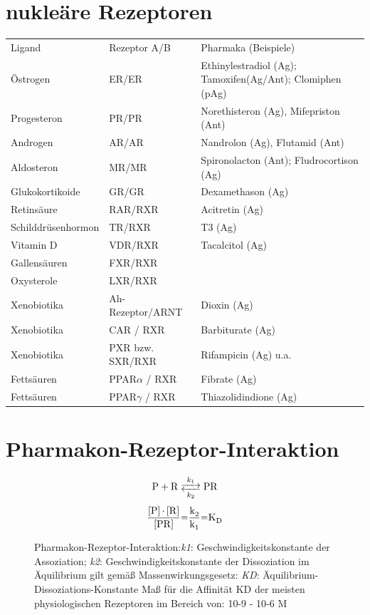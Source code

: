 \documentclass[10pt,a4paper]{report}
\newenvironment{reaction}{\begin{equation}}{\end{equation}}
\begin{document}
\section{nukleäre Rezeptoren}
\begin{tabularx}{\textwidth}{XXX}
Ligand&Rezeptor A/B&Pharmaka (Beispiele)\\
Östrogen&ER/ER&Ethinylestradiol (Ag); Tamoxifen(Ag/Ant); Clomiphen (pAg)\\
Progesteron&PR/PR&Norethisteron (Ag), Mifepriston (Ant)\\
Androgen&AR/AR&Nandrolon (Ag), Flutamid (Ant)\\
Aldosteron&MR/MR&Spironolacton (Ant); Fludrocortison (Ag)\\
Glukokortikoide&GR/GR&Dexamethason (Ag)\\
Retinsäure&RAR/RXR&Acitretin (Ag)\\		
Schilddrüsenhormon&TR/RXR&T3 (Ag)\\
Vitamin D&VDR/RXR&Tacalcitol (Ag)\\
Gallensäuren&FXR/RXR&\\
Oxysterole&LXR/RXR&\\
Xenobiotika&Ah-Rezeptor/ARNT&Dioxin (Ag)\\
Xenobiotika&CAR / RXR&Barbiturate (Ag)\\
Xenobiotika&PXR bzw. SXR/RXR&Rifampicin (Ag) u.a.\\	
Fettsäuren&PPAR$\alpha$ / RXR&Fibrate (Ag)\\
Fettsäuren&PPAR$\gamma$ / RXR&Thiazolidindione (Ag)\\
\end{tabularx}
\section{Pharmakon-Rezeptor-Interaktion}
\begin{figure}[h]
\begin{reaction}
	\ce{P + R <-->[{k_1}][{k_2}] PR}
\end{reaction}	
\begin{reaction}
	\ce{\frac{[P] * [R]}{[PR]}=\frac{k_2}{k_1}=K_D}
\end{reaction}
\caption{Pharmakon-Rezeptor-Interaktion:\textit{k1}: Geschwindigkeitskonstante der Assoziation;
\textit{k2}: Geschwindigkeitskonstante der Dissoziation 
im Äquilibrium gilt gemäß Massenwirkungsgesetz:
\textit{KD}: Äquilibrium-Dissoziations-Konstante
       Maß für die Affinität
KD der meisten physiologischen Rezeptoren im Bereich von: 10-9 - 10-6 M}
\end{figure}
\end{document}
